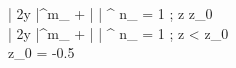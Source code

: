 \left| 2y \right|^{m_} +  \left|   \right| ^ {n_} = 1 \; ; \quad z \geq z_0 \\

\left| 2y \right|^{m_} +  \left|   \right| ^ {n_} = 1 \; ; \quad z < z_0 \\

z_0 = -0.5


